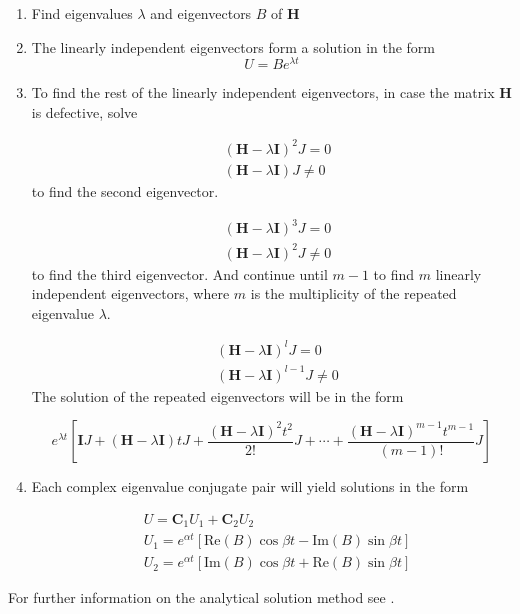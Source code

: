 \documentclass{article}
\begin{document}
				\begin{enumerate}
					\item Find eigenvalues $\lambda$ and eigenvectors $B$ of $\textbf{H}$
					\item The linearly independent eigenvectors form a solution in the form
						\begin{equation*}
							U = Be^{\lambda t}
						\end{equation*}	

					\item To find the rest of the linearly independent eigenvectors, in case the matrix $\textbf{H}$ is defective, solve 

					\begin{align*}
						&(\textbf{H}-\lambda \textbf{I})^2J = 0\\
  						&(\textbf{H}-\lambda \textbf{I})J\neq 0
					\end{align*}
to find the second eigenvector.

					\begin{align*}
						&(\textbf{H}-\lambda \textbf{I})^3 J= 0\\
  						&(\textbf{H}-\lambda \textbf{I})^2J\neq 0
					\end{align*}
to find the third eigenvector. And continue until $m-1$ to find $m$ linearly independent eigenvectors, where $m$ is the multiplicity of the repeated eigenvalue $\lambda$. 

					\begin{align*}
						&(\textbf{H}-\lambda \textbf{I})^l J= 0\\
  						&(\textbf{H}-\lambda \textbf{I})^{l-1}J\neq 0
					\end{align*}
The solution of the repeated eigenvectors will be in the form 

					\begin{equation*}
						e^{\lambda t}\left[\textbf{I}J + (\textbf{H}-\lambda \textbf{I})tJ+ \frac{(\textbf{H}-\lambda \textbf{I})^2t^2}{2!}J + \cdots + \frac{(\textbf{H}-\lambda \textbf{I})^{m-1}t^{m-1}}{(m-1)!}J\right]
					\end{equation*}

					\item Each complex eigenvalue conjugate pair will yield solutions in the form

						\begin{align*}
							&U = \textbf{C}_1U_1 + \textbf{C}_2U_2\\
							&U_1 = e^{\alpha t}\left[\text{Re}(B)\cos{\beta t} -\text{Im}(B)\sin{\beta t}\right]\\
							&U_2 = e^{\alpha t}\left[\text{Im}(B)\cos{\beta t} +\text{Re}(B)\sin{\beta t} \right]
						\end{align*}
				\end{enumerate}
For further information on the analytical solution method see \cite{Braun}.
\end{document}
